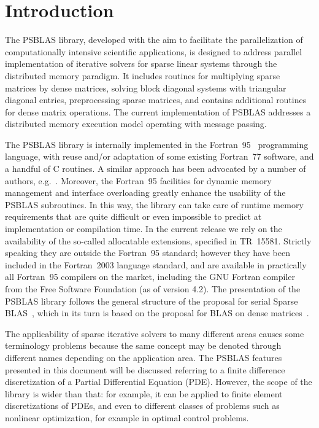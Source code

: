 \section{Introduction}\label{sec:intro}

The PSBLAS library, developed with the aim to facilitate the
parallelization of computationally intensive scientific applications,
is designed to address parallel implementation of iterative solvers
for sparse linear systems through the distributed memory paradigm.  It
includes routines for multiplying sparse matrices by dense matrices,
solving block diagonal systems with triangular diagonal entries,
preprocessing sparse matrices, and contains additional routines for
dense matrix operations.  The current implementation of PSBLAS
addresses a distributed memory execution model operating with message
passing. 

The PSBLAS library is internally implemented in
 the Fortran~95~\cite{metcalf} programming language, with reuse and/or
 adaptation of some existing Fortran~77 software, and a handful of C
 routines. 
A similar approach has been advocated by a number of authors,
e.g.~\cite{machiels}.  Moreover, the Fortran~95 facilities for dynamic
memory management and interface overloading greatly enhance the
usability of the PSBLAS 
subroutines. In this way, the library can take care of runtime memory
requirements that are quite difficult or even impossible to predict at
implementation or compilation time.  
In the current release we rely on the availability of the so-called
allocatable extensions, specified in TR~15581. Strictly speaking they
are outside the Fortran~95 standard; however they have been included
in  the Fortran~2003 language standard, and are available in
practically all Fortran~95 compilers on the market, including the GNU
Fortran compiler from the Free Software Foundation (as of version 4.2). 
The presentation of the
PSBLAS library follows the general structure of the proposal for
serial Sparse BLAS~\cite{sblas97,sblas02}, which in its turn is based on the
proposal for BLAS on dense matrices~\cite{BLAS1,BLAS2,BLAS3}.

The applicability of sparse iterative solvers to many different areas
causes some terminology problems because the same concept may be
denoted through different names depending on the application area. The
PSBLAS features presented in this document will be discussed referring
to a   finite difference discretization of a Partial Differential
Equation (PDE). However, the scope of the library is wider than
that: for example, it can be applied to finite element discretizations
of PDEs, and even to different classes of problems such as nonlinear
optimization, for example in optimal control problems.

